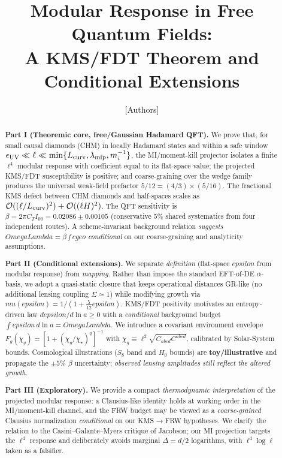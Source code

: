 \documentclass[aps,prd,onecolumn,superscriptaddress,nofootinbib]{revtex4-2}
\def\OmL{OmegaLambda}%
\def\cgeo{cgeo}%
\def\eps{epsilon}%
\def\mu{mu}%
\def\alpha{alpha}%
\def\alpha_M{alphaM}%
\def\Omega_\Lambda{OmegaLambda}%
\providecommand{\OmL}{\Omega_\Lambda}
\providecommand{\cgeo}{c_{\rm geo}}
\providecommand{\eps}{\varepsilon}
\begin{document}
\title{Modular Response in Free Quantum Fields:\\
A KMS/FDT Theorem and Conditional Extensions}

\author{[Authors]}
\affiliation{[Institutions]}
\date{}

\begin{abstract}
\textbf{Part I (Theoremic core, free/Gaussian Hadamard QFT).} We prove that, for small causal diamonds (CHM) in locally Hadamard states and within a safe window \(\epsilon_{\rm UV}\ll\ell\ll \min\{L_{\rm curv},\lambda_{\rm mfp},m_i^{-1}\}\), the MI/moment-kill projector isolates a finite \(\ell^4\) modular response with coefficient equal to its flat-space value; the projected KMS/FDT susceptibility is positive; and coarse-graining over the wedge family produces the universal weak-field prefactor \(5/12=(4/3)\times(5/16)\). The fractional KMS defect between CHM diamonds and half-spaces scales as \(\mathcal O((\ell/L_{\rm curv})^2)+\mathcal O((\ell H)^2)\). The QFT sensitivity is \(\beta=2\pi C_T I_{00}=0.02086\pm 0.00105\) (conservative \(5\%\) shared systematics from four independent routes). A scheme-invariant background relation \emph{suggests} \(\OmL=\beta\, f\,\cgeo\) \emph{conditional} on our coarse-graining and analyticity assumptions.

\smallskip
\textbf{Part II (Conditional extensions).} We separate \emph{definition} (flat-space \(\eps\) from modular response) from \emph{mapping}. Rather than impose the standard EFT-of-DE \(\alpha\)-basis, we adopt a quasi-static closure that keeps operational distances GR-like (no additional lensing coupling \(\Sigma\simeq 1\)) while modifying growth via \(\mu(\eps)=1/(1+\tfrac{5}{12}\eps)\). KMS/FDT positivity motivates an entropy-driven law \(d\eps/d\ln a\ge 0\) with a \emph{conditional} background budget \(\int \eps\,d\ln a=\OmL\). We introduce a covariant environment envelope \(F_g(\chi_g)=[1+(\chi_g/\chi_\star)^q]^{-1}\) with \(\chi_g\equiv \ell^2\sqrt{C_{abcd}C^{abcd}}\), calibrated by Solar-System bounds. Cosmological illustrations (\(S_8\) band and \(H_0\) bounds) are \textbf{toy/illustrative} and propagate the \(\pm5\%\) \(\beta\) uncertainty; \emph{observed lensing amplitudes still reflect the altered growth}.

\smallskip
\textbf{Part III (Exploratory).} We provide a compact \emph{thermodynamic interpretation} of the projected modular response: a Clausius-like identity holds at working order in the MI/moment-kill channel, and the FRW budget may be viewed as a \emph{coarse-grained} Clausius normalization \emph{conditional} on our KMS\(\to\)FRW hypotheses. We clarify the relation to the Casini--Galante--Myers critique of Jacobson; our MI projection targets the \(\ell^4\) response and deliberately avoids marginal \(\Delta=d/2\) logarithms, with \(\ell^4\log\ell\) taken as a falsifier.


\end{abstract}
\end{document}
